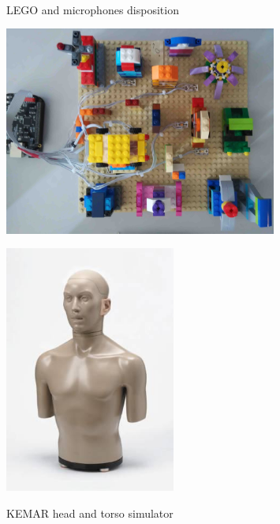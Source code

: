 \begin{figure}[h]
\centering
\begin{minipage}{.5\textwidth}
    \caption{LEGO\textsuperscript{\textcopyright} and microphones disposition}
    \centering
    \label{fig:lego}
    \includegraphics[width=0.8\textwidth]{lego_top.jpg}
\end{minipage}%
\begin{minipage}{.5\textwidth}
    \caption{KEMAR head and torso simulator}
    \centering
    \label{fig:kemar}
    \includegraphics[width=0.5\textwidth]{Kemar.jpeg}
\end{minipage}
\end{figure}